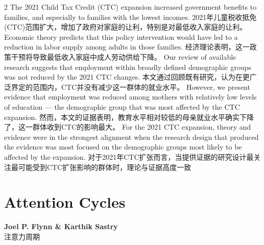 \documentclass[cn,hazy,blue,14pt,screen]{elegantnote}
\begin{document}
\begin{paracol}{2}
	The 2021 Child Tax Credit (CTC) expansion increased government benefits to families, and especially to families with the lowest incomes. 
	\switchcolumn
	2021年儿童税收抵免(CTC)范围扩大，增加了政府对家庭的让利，特别是对最低收入家庭的让利。
	\switchcolumn*
	Economic theory predicts that this policy intervention would have led to a reduction in labor supply among adults in those families. 
	\switchcolumn
	经济理论表明，这一政策干预将导致最低收入家庭中成人劳动供给下降。
	\switchcolumn*
	Our review of available research suggests that employment within broadly defined demographic groups was not reduced by the 2021 CTC changes. 
	\switchcolumn
	本文通过回顾既有研究，认为在更广泛界定的范围内，CTC并没有减少这一群体的就业水平。
	\switchcolumn*
	However, we present evidence that employment was reduced among mothers with relatively low levels of education — the demographic group that was most affected by the CTC expansion. 
	\switchcolumn
	然而，本文的证据表明，教育水平相对较低的母亲就业水平确实下降了，这一群体收到CTC的影响最大。
	\switchcolumn*
	For the 2021 CTC expansion, theory and evidence were in the strongest alignment when the research design that produced the evidence was most focused on the demographic groups most likely to be affected by the expansion.
	\switchcolumn
	对于2021年CTC扩张而言，当提供证据的研究设计最关注最可能受到CTC扩张影响的群体时，理论与证据高度一致
\end{paracol}

\section{Attention Cycles}
\begin{center}
	\textbf{Joel P. Flynn \& Karthik Sastry}\\
	注意力周期
\end{center}
\end{document}
